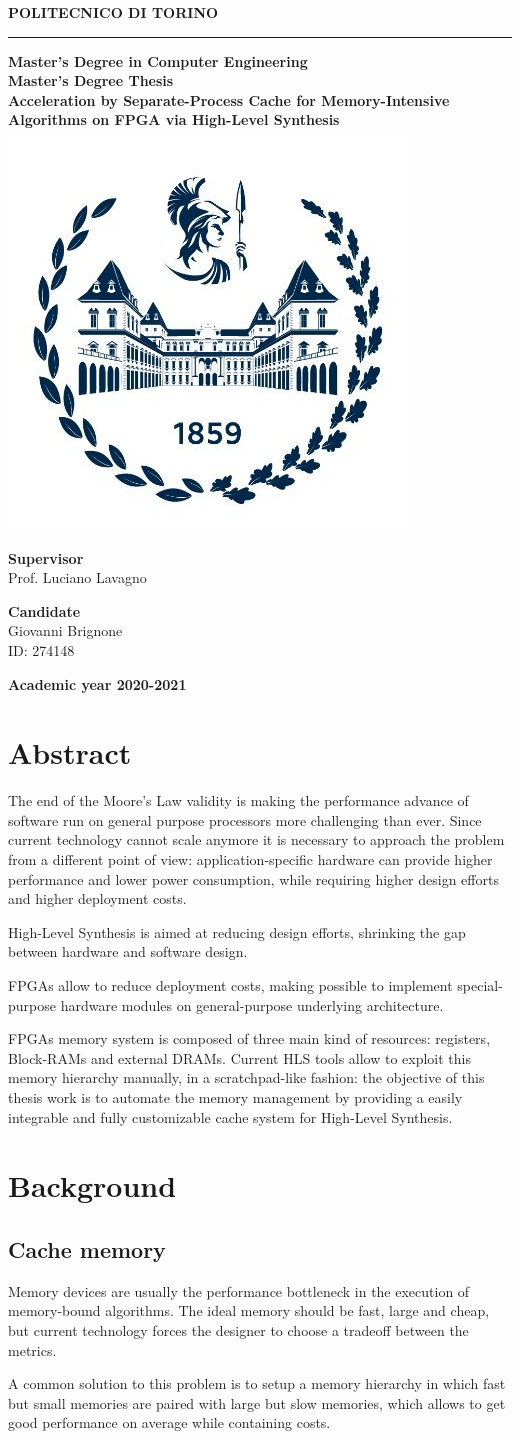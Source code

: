 \documentclass[11pt,a4paper]{memoir}
\renewcommand*{\maketitle}%
{
	\newgeometry{left=2cm,right=2cm,top=3cm,bottom=3.5cm}

	\begin{center}
		\begingroup
		{\Huge\textbf{POLITECNICO DI TORINO}}\\[\baselineskip]
		\rule{\textwidth}{2pt}\par
		\vspace*{1em}
		{\LARGE\textbf{Master's Degree in Computer Engineering}}\\[\baselineskip]
		\vspace*{1em}
		{\Large\textbf{Master's Degree Thesis}}\\
		\vspace*{2cm}
		{\huge\textbf{Acceleration by Separate-Process Cache for
		Memory-Intensive Algorithms on FPGA via High-Level Synthesis}}\\
		\vspace*{1cm}
		\includegraphics[width=.3\textwidth]{figures/polito-logo}
	\end{center}
	\vfill
	\begin{minipage}{0.4\textwidth}
		\begin{flushleft}
			{\Large
				\textbf{Supervisor}\\
				Prof. Luciano Lavagno
			}
		\end{flushleft}
	\end{minipage}
	\begin{minipage}{0.4\textwidth}
		\begin{flushright} 
			{\Large
				\textbf{Candidate}\\
				Giovanni Brignone\\
				ID: 274148
			}
		\end{flushright}
	\end{minipage}  
	\vspace*{2cm}
	\begin{center}
		{\Large\textbf{Academic year 2020-2021}}
	\end{center}
	\endgroup

	\restoregeometry 
}
\begin{document}
\pagestyle{empty}
\maketitle

\frontmatter
\chapter*{Abstract}
The end of the Moore's Law validity is making the performance advance of
software run on general purpose processors more challenging than ever.
Since current technology cannot scale anymore it is necessary to approach the
problem from a different point of view: application-specific hardware can
provide higher performance and lower power consumption, while requiring higher
design efforts and higher deployment costs.

High-Level Synthesis is aimed at reducing design efforts, shrinking the gap
between hardware and software design.

FPGAs allow to reduce deployment costs, making possible to implement
special-purpose hardware modules on general-purpose underlying architecture.

FPGAs memory system is composed of three main kind of resources: registers,
Block-RAMs and external DRAMs.
Current HLS tools allow to exploit this memory hierarchy manually, in a
scratchpad-like fashion: the objective of this thesis work is to automate the
memory management by providing a easily integrable and fully customizable cache
system for High-Level Synthesis.

\pagebreak
\tableofcontents*

\mainmatter
\chapter{Background}
\section{Cache memory}
Memory devices are usually the performance bottleneck in the execution of
memory-bound algorithms.
The ideal memory should be fast, large and cheap, but current technology forces
the designer to choose a tradeoff between the metrics.

A common solution to this problem is to setup a memory hierarchy in
which fast but small memories are paired with large but slow memories, which
allows to get good performance on average while containing costs.
\end{document}
